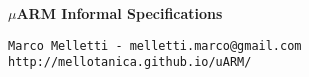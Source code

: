 \documentclass[a4paper,12pt]{report}
\begin{document}
\begin{titlepage}
\begin{center}
	\huge\textbf{$\mu$ARM Informal Specifications}
\end{center}
\vfill
\Large{\texttt{Marco Melletti - melletti.marco@gmail.com\\http://mellotanica.github.io/uARM/}}
\end{titlepage}

\tableofcontents


\end{document}
